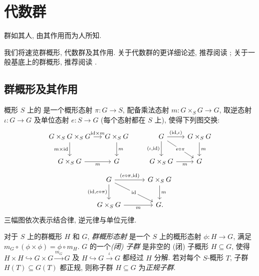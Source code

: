\begingroup
\raggedbottom
\setlength{\emergencystretch}{2em}
\section{代数群}\label{src:B.1}
\begin{epigraph}
群如其人, 由其作用而为人所知.
\end{epigraph}
我们将速览群概形, 代数群及其作用. 关于代数群的更详细论述, 推荐阅读 \cite{Bor91,Hum75,Spr98,Wat79,Mil17}; 关于一般基底上的群概形, 推荐阅读 \cite{SGA3I,SGA3II,SGA3III,DG70,Con14}.

\subsection{群概形及其作用}\label{src:B.1.1-subsection}
\begin{definition}\label{src:B.1.1}
概形 $S$ 上的 是一个概形态射 $\pi:G\to S$, 配备乘法态射 $m:G\times_S G\to G$, 取逆态射 $\iota:G\to G$ 及单位态射 $e:S\to G$ (每个态射都在 $S$ 上), 使得下列图交换:
\[
\begin{tikzcd}[column sep=1.2em,row sep=2em]
G\times_S G\times_S G\arrow[r,"\mathrm{id}\times m"]\arrow[d,"m\times\mathrm{id}"']&G\times_S G\arrow[d,"m"]\\
G\times_S G\arrow[r,"m"']&G
\end{tikzcd}
\qquad
\begin{tikzcd}[column sep=1.2em,row sep=2em]
G\arrow[r,"{(\mathrm{id},\iota)}"]\arrow[d,"{(\iota,\mathrm{id})}"']\arrow[dr,"e\circ\pi" description]&G\times_S G\arrow[d,"m"]\\
G\times_S G\arrow[r,"m"']&G
\end{tikzcd}
\]
\[
\begin{tikzcd}[column sep=3em,row sep=2em]
G\arrow[r,"{(e\circ\pi,\mathrm{id})}"]\arrow[d,"{(\mathrm{id},e\circ\pi)}"']\arrow[dr,"\mathrm{id}" description]&G\times_S G\arrow[d,"m"]\\
G\times_S G\arrow[r,"m"']&G.
\end{tikzcd}
\]
三幅图依次表示结合律, 逆元律与单位元律.

对于 $S$ 上的群概形 $H$ 和 $G$, \textit{群概形态射} 是一个 $S$ 上的概形态射 $\phi:H\to G$, 满足 $m_G\circ(\phi\times\phi)=\phi\circ m_H$. $G$ 的一个\textit{(闭) 子群} 是非空的 (闭) 子概形 $H\subseteq G$, 使得 $H\times H\hookrightarrow G\times G\xrightarrow{m_G}G$ 及 $H\hookrightarrow G\xrightarrow{\iota}G$ 都经过 $H$ 分解. 若对每个 $S$-概形 $T$, 子群 $H(T)\subseteq G(T)$ 都正规, 则称子群 $H\subseteq G$ 为\textit{正规子群}.
\end{definition}

